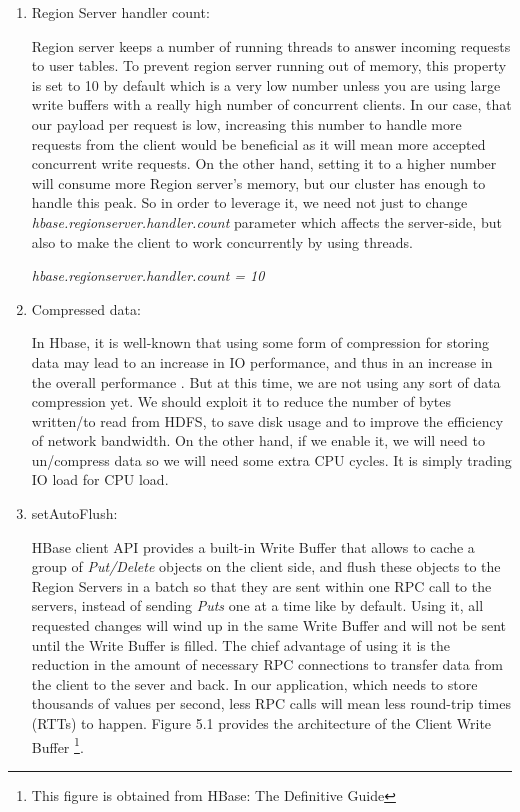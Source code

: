 \begin{enumerate}
\item{Region Server handler count:}
\par
Region server keeps a number of running threads to answer incoming requests to user tables. To prevent region server running out of memory, this property is set to 10 by default which is a very low number unless you are using large write buffers with a really high number of concurrent clients. In our case, that our payload per request is low, increasing this number to handle more requests from the client would be beneficial as it will mean more accepted concurrent write requests. On the other hand, setting it to a higher number will consume more Region server's memory, but our cluster has enough to handle this peak. So in order to leverage it, we need not just to change \textit{hbase.regionserver.handler.count} parameter which affects the server-side, but also to make the client to work concurrently by using threads.

\bigskip

\centerline{\textit{hbase.regionserver.handler.count = 10}}
\bigskip
\item Compressed data:
\par
In Hbase, it is well-known that using some form of compression for storing data may lead to an increase in IO performance, and thus in an increase in the overall performance \cite{raichand2013short} \cite{cheng2013key} \cite{aiyer2012storage} \cite{ApacheHBaseCompression}. But at this time, we are not using any sort of data compression yet. We should exploit it to reduce the number of bytes written/to read from HDFS, to save disk usage and to improve the efficiency of network bandwidth. On the other hand, if we enable it, we will need to un/compress data so we will need some extra CPU cycles. It is simply trading IO load for CPU load.

 \bigskip

\item setAutoFlush:
\par
HBase client API provides a built-in Write Buffer that allows to cache a group of \textit{Put/Delete} objects on the client side, and flush these objects to the Region Servers in a batch so that they are sent within one RPC call to the servers, instead of sending \textit{Puts} one at a time like by default. Using it, all requested changes will wind up in the same Write Buffer and will not be sent until the Write Buffer is filled. The chief advantage of using it is the reduction in the amount of necessary RPC connections to transfer data from the client to the sever and back. In our application, which needs to store thousands of values per second, less RPC calls will mean less round-trip times (RTTs) to happen. Figure 5.1 provides the architecture of the Client Write Buffer \footnote{This figure is obtained from HBase: The Definitive Guide}.


\end{enumerate}
